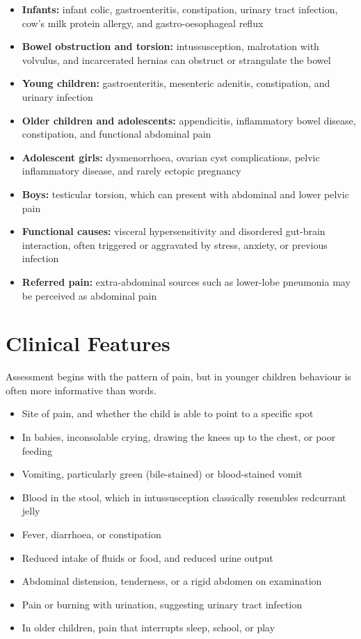 \begin{itemize}
    \item \textbf{Infants:} infant colic, gastroenteritis, constipation, urinary tract infection, cow's milk protein allergy, and gastro-oesophageal reflux
    \item \textbf{Bowel obstruction and torsion:} intussusception, malrotation with volvulus, and incarcerated hernias can obstruct or strangulate the bowel
    \item \textbf{Young children:} gastroenteritis, mesenteric adenitis, constipation, and urinary infection
    \item \textbf{Older children and adolescents:} appendicitis, inflammatory bowel disease, constipation, and functional abdominal pain
    \item \textbf{Adolescent girls:} dysmenorrhoea, ovarian cyst complications, pelvic inflammatory disease, and rarely ectopic pregnancy
    \item \textbf{Boys:} testicular torsion, which can present with abdominal and lower pelvic pain
    \item \textbf{Functional causes:} visceral hypersensitivity and disordered gut-brain interaction, often triggered or aggravated by stress, anxiety, or previous infection
    \item \textbf{Referred pain:} extra-abdominal sources such as lower-lobe pneumonia may be perceived as abdominal pain
\end{itemize}

\section*{Clinical Features}
Assessment begins with the pattern of pain, but in younger children behaviour is often more informative than words.

\begin{itemize}
    \item Site of pain, and whether the child is able to point to a specific spot
    \item In babies, inconsolable crying, drawing the knees up to the chest, or poor feeding
    \item Vomiting, particularly green (bile-stained) or blood-stained vomit
    \item Blood in the stool, which in intussusception classically resembles redcurrant jelly
    \item Fever, diarrhoea, or constipation
    \item Reduced intake of fluids or food, and reduced urine output
    \item Abdominal distension, tenderness, or a rigid abdomen on examination
    \item Pain or burning with urination, suggesting urinary tract infection
    \item In older children, pain that interrupts sleep, school, or play
\end{itemize}

